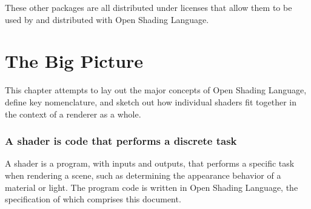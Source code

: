 \documentclass[11pt,letterpaper]{book}
\def\langname{Open Shading Language\xspace}
\def\product{{\sffamily Open Shading Language}\xspace}
\begin{document}
These other packages are all distributed under licenses that allow them
to be used by and distributed with \product.

\bigskip

%
% 


\chapter{The Big Picture}
\label{chap:shaderstructure}
\label{chap:bigpicture}

This chapter attempts to lay out the major concepts of \langname,
define key nomenclature, and sketch out how individual shaders fit 
together in the context of a renderer as a whole.


\subsection*{A shader is code that performs a discrete task}

A shader is a program, with inputs and outputs, that performs a specific
task when rendering a scene, such as determining the appearance behavior
of a material or light.  The program code is written in \langname, the
specification of which comprises this document.
\end{document}

